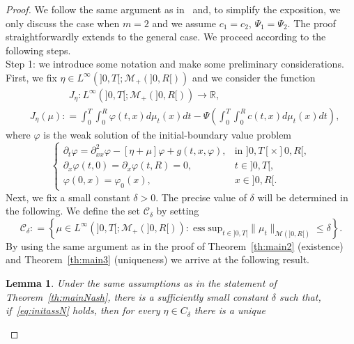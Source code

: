 \documentclass[11pt,leqno]{amsart}
\newtheorem{lemma}[theorem]{Lemma}
\numberwithin{equation}{section}
\begin{document}
\begin{proof}
We follow the same argument as in~\cite[\S6]{BS1} and,  to simplify the exposition, we only discuss the case when $m=2$ and we assume $c_1=c_2$, $\Psi_1=\Psi_2$. The proof straightforwardly extends to the general case. We proceed according to the following steps. \\
{\sc Step 1:} we introduce some notation and make some preliminary considerations. 
First, we fix ${\eta \in L^\infty (]0, T[ ; \mathcal M_+ (]0, R[))}$ and 
we consider the function 
\begin{equation}
\label{e:N:gei}
\begin{split}
    & \qquad \qquad J_\eta: 
    L^\infty (]0, T[ ; \mathcal M_+ (]0, R[))\to {\mathbb{R}}, \\
    &J_\eta (\mu) : =
    \int_0^T \int_0^R 
    {\varphi} (t, x) d \mu_t (x) dt - \Psi \left( 
    \int_0^T \int_0^R 
    c (t, x) d \mu_t (x) dt \right), 
    \end{split}
\end{equation}
where ${\varphi}$ is the weak solution of the initial-boundary value problem
\begin{equation}
\label{e:N:ibvp}
  \begin{cases}
{\partial_t} {\varphi} = {\partial_{xx}^2} {\varphi} -  [\eta + \mu] {\varphi} + g(t,x, {\varphi}), & \text{in $]0, T[ \times ]0, R[$} ,  \\
{\partial_x } {\varphi}(t,0)={\partial_x }{\varphi}(t,R) = 0, & t \in ]0, T[, \\
{\varphi}(0,x) = {\varphi}_0(x), & x \in ]0,R[.
    \end{cases}
\end{equation}
Next, we fix a small constant $\delta>0$. The precise value of $\delta$ will be determined in the following. We define the set $\mathcal C_\delta$ by setting 
\begin{equation}
\label{e:cidelta}
  \mathcal C_\delta : = 
  \left\{ 
  \mu \in L^\infty (]0, T[ ; \mathcal M_+ (]0, R[)): \;
  \mathrm{ess \; sup}_{t \in ]0, T[} \| \mu_t \|_{\mathcal M (]0, R[)}  
  \leq \delta 
  \right\}. 
\end{equation} 
By using the same argument as in the proof of Theorem~\ref{th:main2} (existence) and Theorem~\ref{th:main3} (uniqueness) we arrive at the following result. 
\begin{lemma}
\label{l:exunash}
Under the same assumptions as in the statement of Theorem~\ref{th:mainNash}, there is a sufficiently small constant $\delta$ such that, if~\eqref{eq:initassN} holds, then for every $\eta \in C_\delta$ there is a unique 

\end{lemma}
\end{proof}
\end{document}
